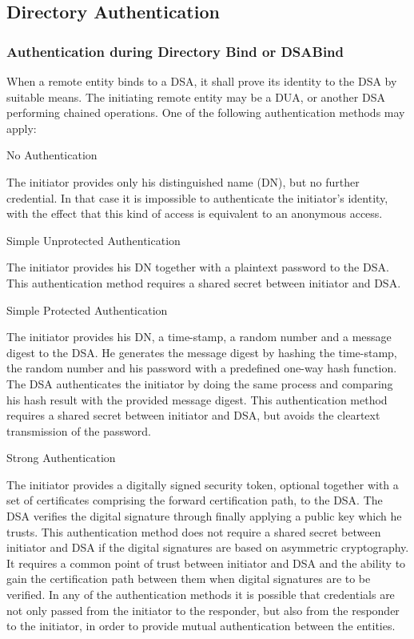 \subsection{Directory Authentication}


\subsubsection{Authentication during Directory Bind or DSABind}
\label{bind}

When a remote entity binds to a DSA, it shall prove its identity to the
DSA by suitable means. The initiating remote entity may be a DUA, or another 
DSA performing chained operations. One of the following authentication
methods may apply:

\bi

\m No Authentication

  The initiator provides only his distinguished name (DN), but no further
  credential. In that case it is impossible to authenticate the initiator's 
  identity, with the effect that this kind of access is equivalent to an
  anonymous access.

\m Simple Unprotected Authentication

  The initiator provides his DN together with a plaintext password to the
  DSA. This authentication method requires a shared secret between initiator 
  and DSA.

\m Simple Protected Authentication

  The initiator provides his DN, a time-stamp, a random number and a message
  digest to the DSA. He generates the message digest by hashing the 
  time-stamp, the random number and his password with a predefined one-way hash 
  function. The DSA authenticates the initiator by doing the same process and 
  comparing his hash result with the provided message digest. This authentication
  method requires a shared secret between initiator and DSA, but avoids the 
  cleartext transmission of the password.

\m Strong Authentication

  The initiator provides a digitally signed security token, optional together
  with a set of certificates comprising the forward certification path, to the 
  DSA. The DSA verifies the digital signature through finally applying a public 
  key which he trusts. This authentication method does not require a shared secret
  between initiator and DSA if the digital signatures are based on asymmetric 
  cryptography. It requires a common point of trust between initiator and DSA and 
  the ability to gain the certification path between them when digital signatures 
  are to be verified.
\ei
In any of the authentication methods it is possible that credentials are
not only passed from the initiator to the responder, but also from the responder
to the initiator, in order to provide mutual authentication between the entities.

